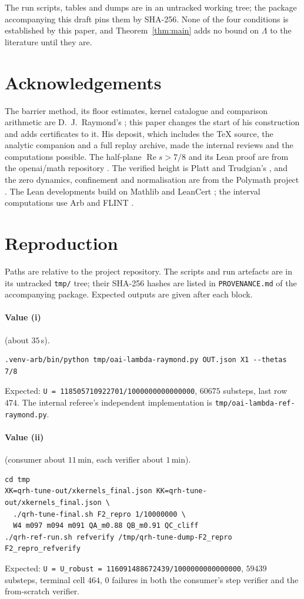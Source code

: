 \documentclass[11pt]{article}
\theoremstyle{definition}
\newcommand{\LB}{\Lambda}
\DeclareMathOperator{\Rea}{Re}
\begin{document}
The run scripts, tables and dumps are in an untracked working tree; the package accompanying
this draft pins them by SHA-256. None of the four conditions is established by this paper, and
Theorem~\ref{thm:main} adds no bound on $\LB$ to the literature until they are.

\section*{Acknowledgements}

The barrier method, its floor estimates, kernel catalogue and comparison arithmetic are
D.~J.~Raymond's \cite{Raymond26}; this paper changes the start of his construction and adds
certificates to it. His deposit, which includes the TeX source, the analytic companion and a
full replay archive, made the internal reviews and the computations possible. The half-plane
$\Rea s>7/8$ and its Lean proof are from the openai/math repository \cite{OpenAI26QRH}. The
verified height is Platt and Trudgian's \cite{PlattTrudgian21}, and the zero dynamics,
confinement and normalisation are from the Polymath project \cite{Polymath19}. The Lean
developments build on Mathlib \cite{Mathlib20} and LeanCert \cite{LeanCert}; the interval
computations use Arb and FLINT \cite{JohanssonArb17,FLINT}.

\appendix
\section{Reproduction}\label{app:repro}

Paths are relative to the project repository. The scripts and run artefacts are in its
untracked \texttt{tmp/} tree; their SHA-256 hashes are listed in \texttt{PROVENANCE.md} of
the accompanying package. Expected outputs are given after each block.

\paragraph{Value (i)} (about $35$\,s).
{\small
\begin{verbatim}
.venv-arb/bin/python tmp/oai-lambda-raymond.py OUT.json X1 --thetas 7/8
\end{verbatim}}
\noindent Expected: \texttt{U = 118505710922701/1000000000000000}, $60675$ substeps, last
row $474$. The internal referee's independent implementation is
\texttt{tmp/oai-lambda-ref-raymond.py}.

\paragraph{Value (ii)} (consumer about $11$\,min, each verifier about $1$\,min).
{\small
\begin{verbatim}
cd tmp
XK=qrh-tune-out/xkernels_final.json KK=qrh-tune-out/xkernels_final.json \
  ./qrh-tune-final.sh F2_repro 1/10000000 \
  W4 m097 m094 m091 QA_m0.88 QB_m0.91 QC_cliff
./qrh-ref-run.sh refverify /tmp/qrh-tune-dump-F2_repro F2_repro_refverify
\end{verbatim}}
\noindent Expected: \texttt{U = U\_robust = 116091488672439/1000000000000000}, $59439$
substeps, terminal cell $464$, $0$ failures in both the consumer's step verifier and the
from-scratch verifier.
\end{document}
